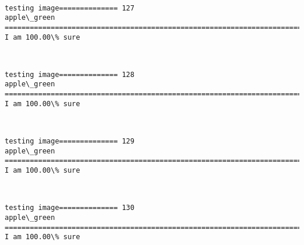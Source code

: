 \documentclass[11pt]{article}
\begin{document}
    \begin{center}
    \end{center}
    { \hspace*{\fill} \\}
    
    \begin{Verbatim}[commandchars=\\\{\}]
testing image============== 127
apple\_green
============================================================================
I am 100.00\% sure

    \end{Verbatim}

    \begin{center}
    \end{center}
    { \hspace*{\fill} \\}
    
    \begin{Verbatim}[commandchars=\\\{\}]
testing image============== 128
apple\_green
============================================================================
I am 100.00\% sure

    \end{Verbatim}

    \begin{center}
    \end{center}
    { \hspace*{\fill} \\}
    
    \begin{Verbatim}[commandchars=\\\{\}]
testing image============== 129
apple\_green
============================================================================
I am 100.00\% sure

    \end{Verbatim}

    \begin{center}
    \end{center}
    { \hspace*{\fill} \\}
    
    \begin{Verbatim}[commandchars=\\\{\}]
testing image============== 130
apple\_green
============================================================================
I am 100.00\% sure

    \end{Verbatim}
\end{document}
